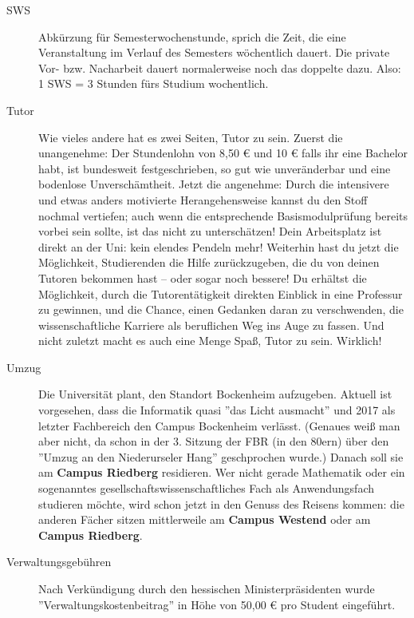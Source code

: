 \begin{description}
\item[SWS] Abkürzung für Semesterwochenstunde, sprich die Zeit, die
eine Veranstaltung im Verlauf des Semesters wöchentlich dauert. Die
private Vor- bzw. Nacharbeit dauert normalerweise noch das doppelte
dazu. Also: 1 SWS = 3 Stunden fürs Studium wochentlich.


\item[Tutor] Wie vieles andere hat es zwei Seiten, Tutor zu sein.
Zuerst die unangenehme: Der Stundenlohn von 8,50 \euro{} und 10
\euro{} falls ihr eine Bachelor habt, ist bundesweit festgeschrieben,
so gut wie unveränderbar und eine bodenlose Unverschämtheit. Jetzt die
angenehme: Durch die intensivere und etwas anders motivierte
Herangehensweise kannst du den Stoff nochmal vertiefen; auch wenn die
entsprechende Basismodulprüfung bereits vorbei sein sollte, ist das
nicht zu unterschätzen! Dein Arbeitsplatz ist direkt an der Uni: kein
elendes Pendeln mehr! Weiterhin hast du jetzt die Möglichkeit,
Studierenden die Hilfe zurückzugeben, die du von deinen Tutoren
bekommen hast – oder sogar noch bessere! Du erhältst die Möglichkeit,
durch die Tutorentätigkeit direkten Einblick in eine Professur zu
gewinnen, und die Chance, einen Gedanken daran zu verschwenden, die
wissenschaftliche Karriere als beruflichen Weg ins Auge zu fassen. Und
nicht zuletzt macht es auch eine Menge Spaß, Tutor zu sein. Wirklich!


\item[Umzug] Die Universität plant, den Standort Bockenheim
aufzugeben. Aktuell ist vorgesehen, dass die Informatik quasi ''das
Licht ausmacht'' und 2017 als letzter Fachbereich den Campus
Bockenheim verlässt. (Genaues weiß man aber nicht, da schon in der 3. Sitzung der FBR (in den 80ern) über den ''Umzug an den Niederurseler Hang'' geschprochen wurde.)
Danach soll sie am \textbf{Campus Riedberg}
residieren.%
Wer nicht gerade Mathematik oder ein sogenanntes
gesellschaftswissenschaftliches Fach als Anwendungsfach studieren
möchte, wird schon jetzt in den Genuss des Reisens kommen: die anderen
Fächer sitzen mittlerweile am \textbf{Campus Westend} oder am
\textbf{Campus Riedberg}.


\item[Verwaltungsgebühren] Nach Verkündigung durch den hessischen
Ministerpräsidenten wurde ''Verwaltungskostenbeitrag'' in Höhe von 50,00
\euro{} pro Student eingeführt.


\end{description}
